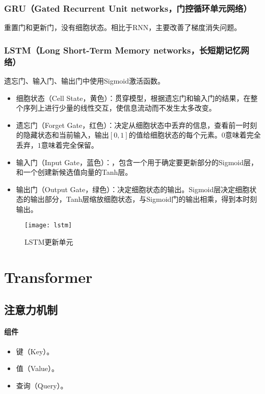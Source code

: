 \documentclass[
12pt, %
a4paper, 
oneside, %
headinclude,footinclude, %
]{scrartcl}
\begin{document}
\subsubsection[GRU]{GRU（Gated Recurrent Unit networks，门控循环单元网络）}
重置门和更新门，没有细胞状态。相比于RNN，主要改善了梯度消失问题。
\subsubsection[LSTM]{LSTM（Long Short-Term Memory networks，长短期记忆网络）}
遗忘门、输入门、输出门中使用Sigmoid激活函数。
\begin{itemize}
\item 细胞状态（Cell State，黄色）：贯穿模型，根据遗忘门和输入门的结果，在整个序列上进行少量的线性交互，使信息流动而不发生太多改变。
\item 遗忘门（Forget Gate，红色）：决定从细胞状态中丢弃的信息，查看前一时刻的隐藏状态和当前输入，输出$ [0, 1] $的值给细胞状态的每个元素。$ 0 $意味着完全丢弃，$ 1 $意味着完全保留。
\item 输入门（Input Gate，蓝色）：，包含一个用于确定要更新部分的Sigmoid层，和一个创建新候选值向量的Tanh层。 
\item 输出门（Output Gate，绿色）：决定细胞状态的输出。Sigmoid层决定细胞状态的输出部分，Tanh层缩放细胞状态，与Sigmoid门的输出相乘，得到本时刻输出。
\end{itemize}

\begin{figure}[H]
\centering 
\texttt{[image: lstm]} 
\caption{LSTM更新单元}
\end{figure}
\section{Transformer}
\subsection[注意力机制]{注意力机制}
\paragraph{组件}
\begin{itemize}
\item 键（Key）。
\item 值（Value）。
\item 查询（Query）。
\end{itemize}
\end{document}
